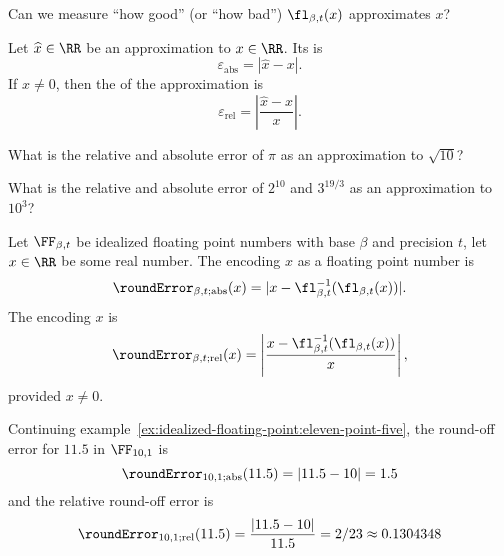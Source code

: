 \begin{puzzle}
Can we measure ``how good'' (or ``how bad'') $\fl_{\beta,t}(x)$
approximates $x$?
\end{puzzle}

\begin{defn}\label{defn:absolute-error}\label{defn:relative-error}
  Let $\widehat{x}\in\RR$ be an approximation to $x\in\RR$. Its
   is
  \begin{equation}
    \varepsilon_{\text{abs}} = |\widehat{x} - x|.
  \end{equation}
  If $x\neq0$, then the  of the approximation is
  \begin{equation}
    \varepsilon_{\text{rel}} = \left|\frac{\widehat{x}-x}{x}\right|.
  \end{equation}
\end{defn}

\begin{xca}
What is the relative and absolute error of $\pi$ as an approximation to $\sqrt{10}$?
\end{xca}
\begin{xca}
What is the relative and absolute error of $2^{10}$ and $3^{19/3}$ as an
approximation to $10^{3}$?
\end{xca}

\begin{defn}\label{defn:round-off-error}
Let $\FF_{\beta,t}$ be idealized floating point numbers with base
$\beta$ and precision $t$, let $x\in\RR$ be some real number. The
 encoding $x$ as a floating point number is
\begin{equation}
\roundError_{\beta,t;\text{abs}}(x) = |x - \fl_{\beta,t}^{-1}(\fl_{\beta,t}(x))|.
\end{equation}
The  encoding $x$ is
\begin{equation}
\roundError_{\beta,t;\text{rel}}(x) = \left|\frac{x - \fl_{\beta,t}^{-1}(\fl_{\beta,t}(x))}{x}\right|,
\end{equation}
provided $x\neq0$.
\end{defn}

\begin{ex}
  Continuing
  example~\ref{ex:idealized-floating-point:eleven-point-five},
  the round-off error for $11.5$ in $\FF_{10,1}$ is
  \begin{equation}
    \roundError_{10,1;\text{abs}}(11.5) = |11.5 - 10| = 1.5
  \end{equation}
  and the relative round-off error is
  \begin{equation}
    \roundError_{10,1;\text{rel}}(11.5) = \frac{|11.5 - 10|}{11.5} = 2/23\approx 0.1304348
  \end{equation}
\end{ex}

